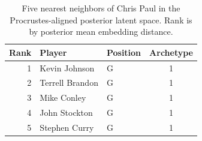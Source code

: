 \begin{table}[htbp]
  \centering\small
  \begin{tabular}{rllc}
    \toprule
    Rank & Player & Position & Archetype \\
    \midrule
    1 & Kevin Johnson & G & 1 \\
    2 & Terrell Brandon & G & 1 \\
    3 & Mike Conley & G & 1 \\
    4 & John Stockton & G & 1 \\
    5 & Stephen Curry & G & 1 \\
    \bottomrule
  \end{tabular}
  \caption{Five nearest neighbors of Chris Paul in the Procrustes-aligned posterior latent space. Rank is by posterior mean embedding distance.}
  \label{tab:Chris_Paul_neighbors}
\end{table}

